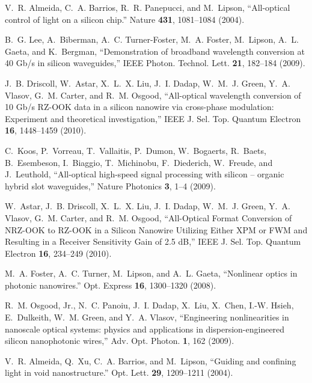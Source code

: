 \begin{thebibliography}{10}
\newcommand{\enquote}[1]{``#1''}

V.~R. Almeida, C.~A. Barrios, R.~R. Panepucci, and M.~Lipson,
  \enquote{{All-optical control of light on a silicon chip.}} Nature
  \textbf{431}, 1081--1084 (2004).

B.~G. Lee, A.~Biberman, A.~C. Turner-Foster, M.~A. Foster, M.~Lipson, A.~L.
  Gaeta, and K.~Bergman, \enquote{{Demonstration of broadband wavelength
  conversion at 40 Gb/s in silicon waveguides},} IEEE Photon. Technol. Lett. \textbf{21}, 182--184 (2009).

J.~B. Driscoll, W.~Astar, X.~L.~X. Liu, J.~I. Dadap, W.~M.~J. Green, Y.~A.
  Vlasov, G.~M. Carter, and R.~M. Osgood, \enquote{{All-optical wavelength
  conversion of 10 Gb/s RZ-OOK data in a silicon nanowire via cross-phase
  modulation: Experiment and theoretical investigation},} IEEE J. Sel. Top. Quantum Electron \textbf{16}, 1448--1459 (2010).

C.~Koos, P.~Vorreau, T.~Vallaitis, P.~Dumon, W.~Bogaerts, R.~Baets,
  B.~Esembeson, I.~Biaggio, T.~Michinobu, F.~Diederich, W.~Freude, and
  J.~Leuthold, \enquote{{All-optical high-speed signal processing with silicon
  – organic hybrid slot waveguides},} Nature Photonics \textbf{3}, 1--4
  (2009).

W.~Astar, J.~B. Driscoll, X.~L.~X. Liu, J.~I. Dadap, W.~M.~J. Green, Y.~A.
  Vlasov, G.~M. Carter, and R.~M. Osgood, \enquote{{All-Optical Format
  Conversion of NRZ-OOK to RZ-OOK in a Silicon Nanowire Utilizing Either XPM or
  FWM and Resulting in a Receiver Sensitivity Gain of 2.5 dB},} IEEE J. Sel. Top. Quantum Electron \textbf{16}, 234--249 (2010).

M.~A. Foster, A.~C. Turner, M.~Lipson, and A.~L. Gaeta, \enquote{{Nonlinear
  optics in photonic nanowires.}} Opt. Express \textbf{16}, 1300--1320
  (2008).

R.~M. Osgood, Jr., N.~C. Panoiu, J.~I. Dadap, X.~Liu, X.~Chen, I.-W. Hsieh,
  E.~Dulkeith, W.~M. Green, and Y.~A. Vlasov, \enquote{{Engineering
  nonlinearities in nanoscale optical systems: physics and applications in
  dispersion-engineered silicon nanophotonic wires},} Adv. Opt. Photon. \textbf{1}, 162 (2009).

V.~R. Almeida, Q.~Xu, C.~A. Barrios, and M.~Lipson, \enquote{{Guiding and
  confining light in void nanostructure.}} Opt. Lett. \textbf{29}, 1209--1211
  (2004).


\end{thebibliography}
